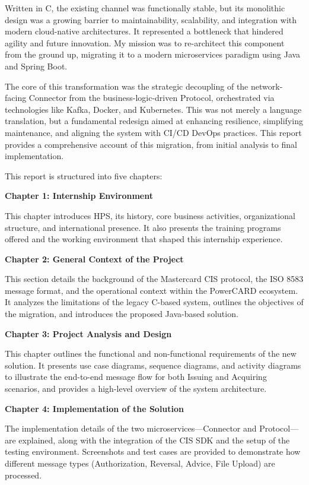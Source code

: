 \documentclass[12pt,a4paper]{report}
\begin{document}
Written in C, the existing channel was functionally stable, but its monolithic design was a growing barrier to maintainability, scalability, and integration with modern cloud-native architectures. It represented a bottleneck that hindered agility and future innovation. My mission was to re-architect this component from the ground up, migrating it to a modern microservices paradigm using Java and Spring Boot.

The core of this transformation was the strategic decoupling of the network-facing Connector from the business-logic-driven Protocol, orchestrated via technologies like Kafka, Docker, and Kubernetes. This was not merely a language translation, but a fundamental redesign aimed at enhancing resilience, simplifying maintenance, and aligning the system with CI/CD DevOps practices. This report provides a comprehensive account of this migration, from initial analysis to final implementation.

This report is structured into five chapters:

\textbf{Chapter 1: Internship Environment}

This chapter introduces HPS, its history, core business activities, organizational structure, and international presence. It also presents the training programs offered and the working environment that shaped this internship experience.

\textbf{Chapter 2: General Context of the Project}

This section details the background of the Mastercard CIS protocol, the ISO 8583 message format, and the operational context within the PowerCARD ecosystem. It analyzes the limitations of the legacy C-based system, outlines the objectives of the migration, and introduces the proposed Java-based solution.

\textbf{Chapter 3: Project Analysis and Design}

This chapter outlines the functional and non-functional requirements of the new solution. It presents use case diagrams, sequence diagrams, and activity diagrams to illustrate the end-to-end message flow for both Issuing and Acquiring scenarios, and provides a high-level overview of the system architecture.

\textbf{Chapter 4: Implementation of the Solution}

The implementation details of the two microservices—Connector and Protocol—are explained, along with the integration of the CIS SDK and the setup of the testing environment. Screenshots and test cases are provided to demonstrate how different message types (Authorization, Reversal, Advice, File Upload) are processed.
\end{document}
